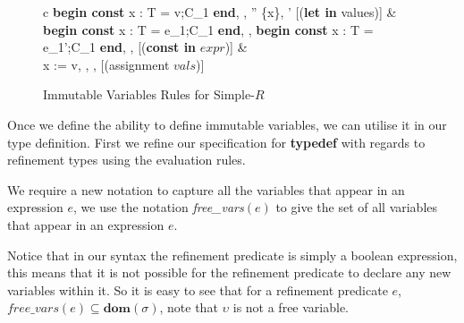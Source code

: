\documentclass[a4paper,12pt]{report}
\begin{document}
\begin{figure}[H]
  \begin{center}
    \begin{tabular}{c}
      {\langle \textbf{begin const }x : T = v;C_1\textbf{ end}, \sigma, \tau \rangle 
      \longrightarrow \langle \sigma'' \setminus \{x\}, \tau' \rangle} [(\textbf{let in} values)] 
      & \\
      \footnotesize
      {\langle \textbf{begin const }x : T = e_1;C_1\textbf{ end}, \sigma,\tau \rangle 
      \longrightarrow \langle \textbf{begin const }x : T = e_1';C_1\textbf{ end}, \sigma, \tau \rangle}
      [(\textbf{const in} $expr$)]
      \normalsize
      & \\
      {\langle x := v, \sigma, \tau \rangle \longrightarrow \langle \sigma[x \mapsto v], \tau \rangle} [(assignment $vals$)]
    \end{tabular}
  \end{center}
  \caption{Immutable Variables Rules for Simple-$R$}
\end{figure}

\par
Once we define the ability to define immutable variables, we can utilise it in 
our type definition. First we refine our specification for \textbf{typedef} 
with regards to refinement types using the evaluation rules.

\par
We require a new notation to capture all the variables that appear in an 
expression $e$, we use the notation \textit{free\_vars}$(e)$ to give the set of all 
variables that appear in an expression $e$.

\par
Notice that in our syntax the refinement predicate is simply a boolean 
expression, this means that it is not possible for the refinement predicate to 
declare any new variables within it. So it is easy to see that for a refinement 
predicate $e$, $\textit{free\_vars}(e) \subseteq \textbf{dom}(\sigma)$, note that 
$\upsilon$ is not a free variable. 
\end{document}
